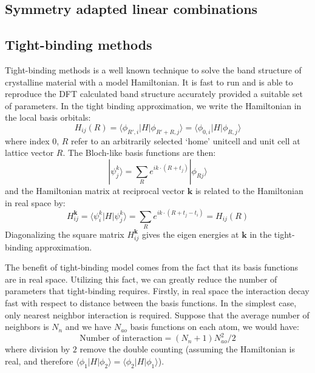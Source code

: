 \documentclass{article}
\begin{document}
\subsection{Symmetry adapted linear combinations}


\subsection{Tight-binding methods}
Tight-binding methods is a well known technique to solve the band structure of 
crystalline material with a model Hamiltonian\cite{ziman_principles_1999}. 
It is fast to run and is able to 
reproduce the DFT calculated band structure accurately provided a suitable set of 
parameters. 
In the tight binding approximation, we write the Hamiltonian in the local 
basis orbitals:
\begin{equation}
    H_{ij}(R) = \langle \phi_{R',i} | H | \phi_{R'+R,j} \rangle = \langle \phi_{0,i} | H | \phi_{R,j} \rangle
\end{equation}
where index 0, $R$ refer to an arbitrarily selected `home' unitcell and unit cell at 
lattice vector $R$. The Bloch-like basis functions are then:
\begin{equation}
    |\psi_j^k\rangle = \sum_R e^{ik\cdot(R+t_j)} |\phi_{Rj} \rangle
\end{equation}
and the Hamiltonian matrix at reciprocal vector $\mathbf{k}$ is related to the 
Hamiltonian in real space by:
\begin{equation}
    H_{ij}^{\mathbf{k}} = \langle \psi_i^k | H |\psi_j^k\rangle = \sum_R e^{ik\cdot(R+t_j-t_i)} = H_{ij}(R)
\end{equation}
Diagonalizing the square matrix $H_{ij}^{\mathbf{k}}$ gives the eigen energies at $\mathbf{k}$
in the tight-binding approximation. 

The benefit of tight-binding model comes from the fact that its basis functions 
are in real space. Utilizing this fact, we can greatly reduce the number of parameters 
that tight-binding requires. 
Firstly, in real space the interaction decay fast with respect to distance between the 
basis functions. In the simplest case, only nearest neighbor interaction is required. 
Suppose that the average number of neighbors is $N_n$ and we have $N_{ao}$ basis functions 
on each atom, we would have:
\begin{equation}
    \text{Number of interaction} = ( N_n + 1 ) N_{ao}^2 / 2
\end{equation}
where division by $2$ remove the double counting (assuming the Hamiltonian is real, and 
therefore $\langle \phi_1 | H | \phi_2 \rangle = \langle \phi_2 | H | \phi_1 \rangle$). 
\end{document}
